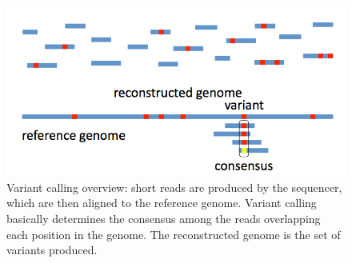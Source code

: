 \documentclass[10pt, conference, compsocconf]{IEEEtran}
\begin{document}
\begin{figure}
\centering
\includegraphics[scale=0.5]{variantCallingOverview}
\caption{Variant calling overview:  short reads are produced by the sequencer, which are then aligned to the reference genome.  Variant calling basically determines the consensus among the reads overlapping each position in the genome.  The reconstructed genome is the set of variants produced.}
\label{fig:variantCallingOverview}
\end{figure}
\end{document}

